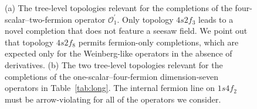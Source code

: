 \begin{figure}[t]
  \centering
  \caption[(a) The tree-level topologies relevant for the completions of the
  four-scalar--two-fermion operator $\mathcal{O}_{1}^{\prime}$. (b) The two
  tree-level topologies relevant for the completions of the
  one-scalar--four-fermion dimension-seven operators in
  Table~\ref{tab:long}.]{(a) The tree-level topologies relevant for the
    completions of the four-scalar--two-fermion operator
    $\mathcal{O}_{1}^{\prime}$. Only topology $4s2f_{3}$ leads to a novel
    completion that does not feature a seesaw field. We point out that topology
    $4s2f_{8}$ permits fermion-only completions, which are expected only for the
    Weinberg-like operators in the absence of derivatives. (b) The two
    tree-level topologies relevant for the completions of the
    one-scalar--four-fermion dimension-seven operators in Table~\ref{tab:long}.
    The internal fermion line on $1s4f_{2}$ must be arrow-violating for all of
    the operators we consider.}
  \label{fig:ch2-d7-topologies}
\end{figure}

